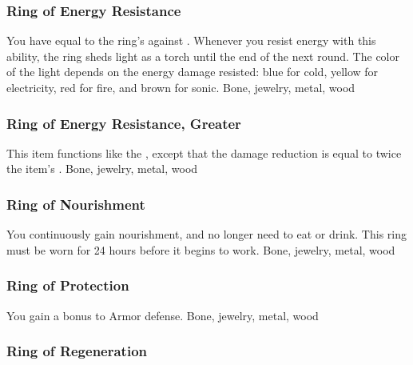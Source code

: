 \hypertarget{item:Ring of Energy Resistance}{\subsubsection{Ring of Energy Resistance\hfill{}}}
You have  equal to the ring's  against .
Whenever you resist energy with this ability, the ring sheds light as a torch until the end of the next round.
The color of the light depends on the energy damage resisted: blue for cold, yellow for electricity, red for fire, and brown for sonic.
 
 Bone, jewelry, metal, wood
\lowercase{\hypertarget{item:Ring of Energy Resistance, Greater}{}}\label{item:Ring of Energy Resistance, Greater}
\hypertarget{item:Ring of Energy Resistance, Greater}{\subsubsection{Ring of Energy Resistance, Greater\hfill{}}}
This item functions like the , except that the damage reduction is equal to twice the item's .
 
 Bone, jewelry, metal, wood
\lowercase{\hypertarget{item:Ring of Nourishment}{}}\label{item:Ring of Nourishment}
\hypertarget{item:Ring of Nourishment}{\subsubsection{Ring of Nourishment\hfill{}}}
You continuously gain nourishment, and no longer need to eat or drink.
This ring must be worn for 24 hours before it begins to work.
 
 Bone, jewelry, metal, wood
\lowercase{\hypertarget{item:Ring of Protection}{}}\label{item:Ring of Protection}
\hypertarget{item:Ring of Protection}{\subsubsection{Ring of Protection\hfill{}}}
You gain a  bonus to Armor defense.
 
 Bone, jewelry, metal, wood
\lowercase{\hypertarget{item:Ring of Regeneration}{}}\label{item:Ring of Regeneration}
\hypertarget{item:Ring of Regeneration}{\subsubsection{Ring of Regeneration\hfill{}}}
